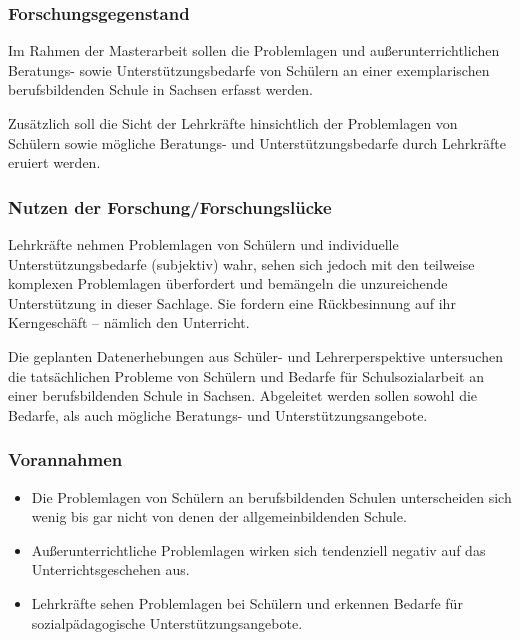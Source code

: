 \subsubsection{Forschungsgegenstand}
\label{sec:Forschungsgegenstand}

Im Rahmen der Masterarbeit sollen die Problemlagen und außerunterrichtlichen Beratungs- sowie Unterstützungsbedarfe von Schülern an einer exemplarischen berufsbildenden Schule in Sachsen erfasst werden.

Zusätzlich soll die Sicht der Lehrkräfte hinsichtlich der Problemlagen von Schülern sowie mögliche Beratungs- und Unterstützungsbedarfe durch Lehrkräfte eruiert werden.

\subsubsection{Nutzen der Forschung/Forschungslücke}
\label{sec:NutzenDerForschungForschungslücke}

Lehrkräfte nehmen Problemlagen von Schülern und individuelle Unterstützungsbedarfe (subjektiv) wahr, sehen sich jedoch mit den teilweise komplexen Problemlagen überfordert und bemängeln die unzureichende Unterstützung in dieser Sachlage. Sie fordern eine Rückbesinnung auf ihr Kerngeschäft -- nämlich den Unterricht.

Die geplanten Datenerhebungen aus Schüler- und Lehrerperspektive untersuchen die tatsächlichen Probleme von Schülern und Bedarfe für Schulsozialarbeit an einer berufsbildenden Schule in Sachsen. Abgeleitet werden sollen sowohl die Bedarfe, als auch mögliche Beratungs- und Unterstützungsangebote.

\subsubsection{Vorannahmen}
\label{sec:Vorannahmen}

\begin{itemize}
	\item Die Problemlagen von Schülern an berufsbildenden Schulen unterscheiden sich wenig bis gar nicht von denen der allgemeinbildenden Schule.
	\item Außerunterrichtliche Problemlagen wirken sich tendenziell negativ auf das Unterrichtsgeschehen aus.
	\item Lehrkräfte sehen Problemlagen bei Schülern und erkennen Bedarfe für sozialpädagogische Unterstützungsangebote. 
\end{itemize}

